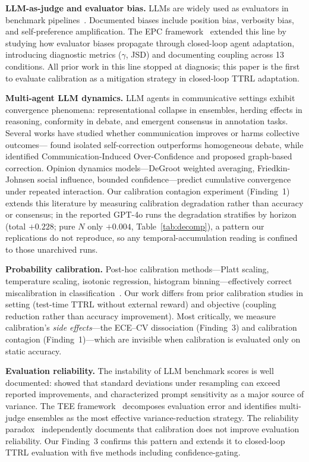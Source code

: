 \documentclass[11pt]{article}
\theoremstyle{definition}
\theoremstyle{remark}
\begin{document}
\textbf{LLM-as-judge and evaluator bias.} LLMs are widely used as evaluators in benchmark pipelines~\citep{zheng2023judging,chiang2024chatbot}. Documented biases include position bias, verbosity bias, and self-preference amplification. The EPC framework~\citep{epc2026} extended this line by studying how evaluator biases propagate through closed-loop agent adaptation, introducing diagnostic metrics ($\gamma$, JSD) and documenting coupling across 13 conditions. All prior work in this line stopped at diagnosis; this paper is the first to evaluate calibration as a mitigation strategy in closed-loop TTRL adaptation.

\textbf{Multi-agent LLM dynamics.} LLM agents in communicative settings exhibit convergence phenomena: representational collapse in ensembles, herding effects in reasoning, conformity in debate, and emergent consensus in annotation tasks. Several works have studied whether communication improves or harms collective outcomes---\citet{bertalanic2026cost} found isolated self-correction outperforms homogeneous debate, while \citet{huang2026cagecal} identified Communication-Induced Over-Confidence and proposed graph-based correction. Opinion dynamics models---DeGroot weighted averaging, Friedkin-Johnsen social influence, bounded confidence---predict cumulative convergence under repeated interaction. Our calibration contagion experiment (Finding~1) extends this literature by measuring calibration degradation rather than accuracy or consensus; in the reported GPT-4o runs the degradation stratifies by horizon (total $+0.228$; pure $N$ only $+0.004$, Table~\ref{tab:decomp}), a pattern our replications do not reproduce, so any temporal-accumulation reading is confined to those unarchived runs.

\textbf{Probability calibration.} Post-hoc calibration methods---Platt scaling, temperature scaling, isotonic regression, histogram binning---effectively correct miscalibration in classification~\citep{guo2017calibration,niculescu2005predicting}. Our work differs from prior calibration studies in setting (test-time TTRL without external reward) and objective (coupling reduction rather than accuracy improvement). Most critically, we measure calibration's \textit{side effects}---the ECE--CV dissociation (Finding~3) and calibration contagion (Finding~1)---which are invisible when calibration is evaluated only on static accuracy.

\textbf{Evaluation reliability.} The instability of LLM benchmark scores is well documented: \citet{dodge2019reproducibility} showed that standard deviations under resampling can exceed reported improvements, and \citet{sclar2024quantifying} characterized prompt sensitivity as a major source of variance. The TEE framework~\citep{messing2026tee} decomposes evaluation error and identifies multi-judge ensembles as the most effective variance-reduction strategy. The reliability paradox~\citep{messing2026tee} independently documents that calibration does not improve evaluation reliability. Our Finding~3 confirms this pattern and extends it to closed-loop TTRL evaluation with five methods including confidence-gating.
\end{document}
